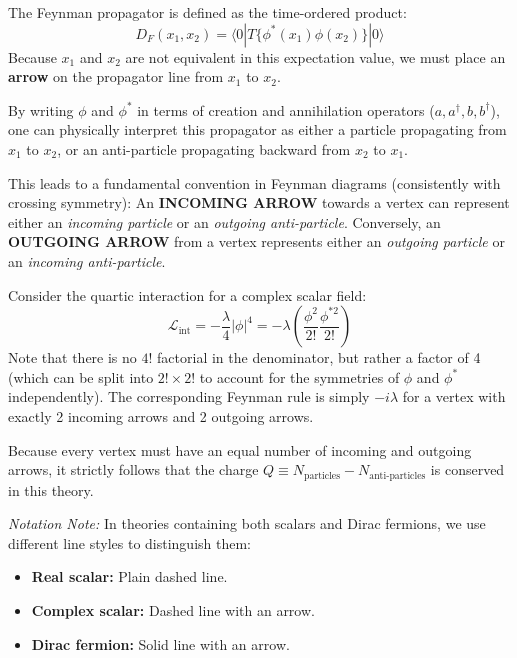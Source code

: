 The Feynman propagator is defined as the time-ordered product:
\[
    D_F(x_1, x_2) = \langle 0 | T \{ \phi^*(x_1) \phi(x_2) \} | 0 \rangle
\]
Because \(x_1\) and \(x_2\) are not equivalent in this expectation value, we must place an \textbf{arrow} on the propagator line from \(x_1\) to \(x_2\).

By writing \(\phi\) and \(\phi^*\) in terms of creation and annihilation operators (\(a, a^\dagger, b, b^\dagger\)), one can physically interpret this propagator as either a particle propagating from \(x_1\) to \(x_2\), or an anti-particle propagating backward from \(x_2\) to \(x_1\).

\begin{remark}
    This leads to a fundamental convention in Feynman diagrams (consistently with crossing symmetry):
    An \textbf{INCOMING ARROW} towards a vertex can represent either an \textit{incoming particle} or an \textit{outgoing anti-particle}. Conversely, an \textbf{OUTGOING ARROW} from a vertex represents either an \textit{outgoing particle} or an \textit{incoming anti-particle}.
\end{remark}

Consider the quartic interaction for a complex scalar field:
\[
    \mathcal{L}_{\text{int}} = -\frac{\lambda}{4} |\phi|^4 = -\lambda \left( \frac{\phi^2}{2!} \frac{\phi^{*2}}{2!} \right)
\]
Note that there is no \(4!\) factorial in the denominator, but rather a factor of 4 (which can be split into \(2! \times 2!\) to account for the symmetries of \(\phi\) and \(\phi^*\) independently).
The corresponding Feynman rule is simply \(-i\lambda\) for a vertex with exactly 2 incoming arrows and 2 outgoing arrows.

Because every vertex must have an equal number of incoming and outgoing arrows, it strictly follows that the charge \(Q \equiv N_{\text{particles}} - N_{\text{anti-particles}}\) is conserved in this theory.

\textit{Notation Note:} In theories containing both scalars and Dirac fermions, we use different line styles to distinguish them:
\begin{itemize}
    \item \textbf{Real scalar:} Plain dashed line.
    \item \textbf{Complex scalar:} Dashed line with an arrow.
    \item \textbf{Dirac fermion:} Solid line with an arrow.
\end{itemize}


